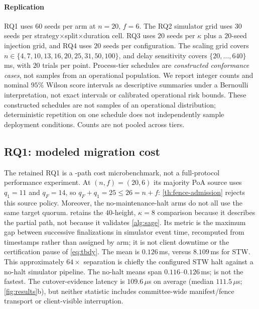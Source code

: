 \paragraph{Replication}
RQ1 uses $60$ seeds per arm at $n=20$, $f=6$. The RQ2 simulator grid uses $30$ seeds per
strategy$\times$split$\times$duration cell. RQ3 uses $20$ seeds per $\kappa$ plus a $20$-seed injection
grid, and RQ4 uses $20$ seeds per configuration. The scaling grid covers
$n\in\{4,7,10,13,16,20,25,31,50,100\}$, and delay sensitivity covers $\{20,\dots,640\}$\,ms, with $20$
trials per point. Process-tier schedules are \emph{constructed conformance cases}, not samples from an
operational population. We report integer counts and nominal $95\%$ Wilson score intervals as
descriptive summaries under a Bernoulli interpretation, not exact intervals or calibrated operational
risk bounds. These constructed schedules are not samples of an operational distribution;
deterministic repetition on one schedule does not independently sample deployment conditions.
Counts are not pooled across tiers.

\subsection{RQ1: modeled migration cost}
\label{sec:rq1}
The retained RQ1 is a \CutCert-path cost microbenchmark, not a full-protocol performance
experiment. At $(n,f)=(20,6)$ its majority PoA source uses $q_1=11$ and $q_F=14$, so
$q_F+q_1=25\le26=n+f$: \cref{th:fence-admission} rejects this source policy. Moreover, the
no-maintenance-halt arms do not all use the same target quorum.  retains the
$40$-height, $\kappa=8$ comparison because it describes the partial path, not because it
validates \cref{alg:sage}. Its metric is the maximum gap between successive finalizations in
simulator event time, recomputed from timestamps rather than assigned by arm; it is not client
downtime or the certification pause of \eqref{eq:tbdy}. The \sage{} mean is $0.126$\,ms,
versus $8.109$\,ms for STW. This approximately $64\times$ separation is chiefly the configured
STW halt against a no-halt simulator pipeline. The no-halt means span $0.116$--$0.126$\,ms;
\sage{} is not the fastest. The \sage{} cutover-evidence latency is $109.6\,\mu$s on
average (median $111.5\,\mu$s; \cref{fig:results}b), but neither statistic includes
committee-wide manifest/fence transport or client-visible interruption.

